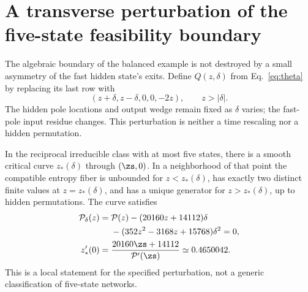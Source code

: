 \section{A transverse perturbation of the five-state feasibility boundary}\label{app:unfolding}
The algebraic boundary of the balanced example is not destroyed by a small
asymmetry of the fast hidden state's exits.  Define $Q(z,\delta)$ from
Eq.~\eqref{eq:theta} by replacing its last row with
\begin{equation}
 (z+\delta,z-\delta,0,0,-2z),\qquad z>|\delta|.
\end{equation}
The hidden pole locations and output wedge remain fixed as $\delta$ varies;
the fast-pole input residue changes.  This perturbation is neither a time
rescaling nor a hidden permutation.

\begin{proposition}\label{prop:unfolding}
In the reciprocal irreducible class with at most five states, there is a
smooth critical curve $z_*(\delta)$ through $(\zs,0)$.  In a neighborhood of
that point the compatible entropy fiber is unbounded for $z<z_*(\delta)$,
has exactly two distinct finite values at $z=z_*(\delta)$, and has a unique
generator for $z>z_*(\delta)$, up to hidden permutations.  The curve satisfies
\begin{align}
 \mathcal P_\delta(z)={}&\mathcal P(z)-(20160z+14112)\delta\nonumber\\
 &-(352z^2-3168z+15768)\delta^2=0,\label{eq:perturbedP}\\
 z_*'(0)={}&\frac{20160\zs+14112}{\mathcal P'(\zs)}
 \simeq0.4650042.\label{eq:perturbedslope}
\end{align}
This is a local statement for the specified perturbation, not a generic
classification of five-state networks.
\end{proposition}


